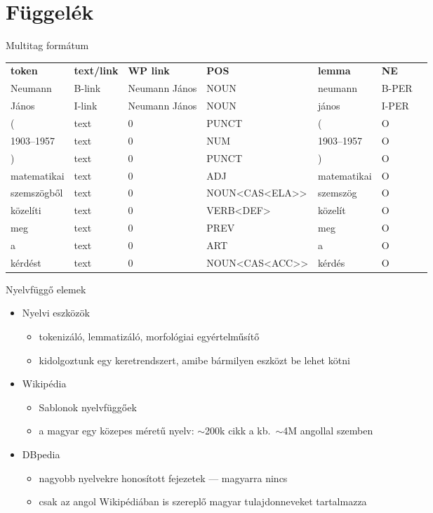 \documentclass[utf8x,t]{beamer}
\newcommand{\vitem}{\item \vspace{4pt}}
\newcommand{\nagytilde}{$\sim$}
\begin{document}
\section{Függelék}

\begin{frame}{Multitag formátum}

\bigskip

{\footnotesize
\begin{tabular}{@{}l@{ }l@{ }l@{ }l@{ }l@{ }l@{ }l}
\textbf{token} & \textbf{text/link} & \textbf{WP link} & \textbf{POS} & \textbf{lemma} & \textbf{NE} \\
Neumann & B-link & Neumann János & NOUN & neumann & B-PER \\
János & I-link & Neumann János & NOUN & jános & I-PER \\
( & text & 0 & PUNCT & ( & O \\
1903–1957 & text & 0 & NUM & 1903–1957 & O \\
) & text & 0 & PUNCT & ) & O \\
matematikai & text & 0 & ADJ & matematikai & O \\
szemszögből & text & 0 & NOUN<CAS<ELA{>}> & szemszög & O \\
közelíti & text & 0 & VERB<DEF> & közelít & O \\
meg & text & 0 & PREV & meg & O \\
a & text & 0 & ART & a & O \\
kérdést & text & 0 & NOUN<CAS<ACC{>}> & kérdés & O \\
\end{tabular}
}

\end{frame}

\begin{frame}{Nyelvfüggő elemek}
  \begin{itemize}
  \vitem Nyelvi eszközök
    \begin{itemize}
    \vitem tokenizáló, lemmatizáló, morfológiai egyértelműsítő
    \vitem kidolgoztunk egy keretrendszert, amibe bármilyen eszközt be lehet kötni
    \end{itemize}
  \vitem Wikipédia
    \begin{itemize}
    \vitem Sablonok nyelvfüggőek
    \vitem a magyar egy közepes méretű nyelv: \nagytilde 200k cikk a kb.~\nagytilde 4M angollal szemben
    \end{itemize}
  \vitem DBpedia
    \begin{itemize}
    \vitem nagyobb nyelvekre honosított fejezetek --- magyarra nincs
    \vitem csak az angol Wikipédiában is szereplő magyar tulajdonneveket tartalmazza
    \end{itemize}
  \end{itemize}
\end{frame}
\end{document}
